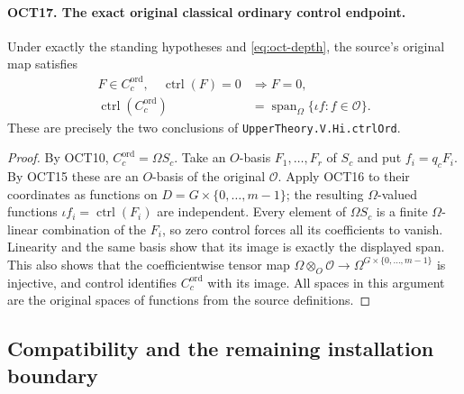 \paragraph{OCT17. The exact original classical ordinary control endpoint.}
\label{claim:OCT17}
Under exactly the standing hypotheses and
\eqref{eq:oct-depth}, the source's original map satisfies
\begin{align}
 F\in C_c^{\mathrm{ord}},\quad\operatorname{ctrl}(F)=0
                                     &\Longrightarrow F=0,\\
 \operatorname{ctrl}(C_c^{\mathrm{ord}})
                   &=\operatorname{span}_{\Omega}
                                \{\iota f:f\in\mathcal O\}.
 \label{eq:oct-endpoint}
\end{align}
These are precisely the two conclusions of
\texttt{UpperTheory.V.Hi.ctrlOrd}.
\begin{proof}
By OCT10, $C_c^{\mathrm{ord}}=\Omega S_c$.
Take an $O$-basis $F_1,\ldots,F_r$ of $S_c$ and put
$f_i=q_cF_i$.  By OCT15 these are an $O$-basis of the
original $\mathcal O$.  Apply OCT16 to their coordinates
as functions on $D=G\times\{0,\ldots,m-1\}$; the resulting
$\Omega$-valued functions $\iota f_i=\operatorname{ctrl}(F_i)$
are independent.  Every element of $\Omega S_c$ is a finite
$\Omega$-linear combination of the $F_i$, so zero control
forces all its coefficients to vanish.  Linearity and the
same basis show that its image is exactly the displayed
span.  This also shows that the coefficientwise tensor map
$\Omega\otimes_O\mathcal O\to\Omega^{G\times\{0,\ldots,m-1\}}$
is injective, and control identifies $C_c^{\mathrm{ord}}$
with its image.  All spaces in this argument are the
original spaces of functions from the source definitions.
\end{proof}

\subsection{Compatibility and the remaining installation boundary}


